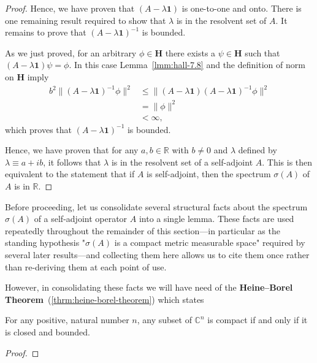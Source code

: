 \begin{proof}
Hence, we have proven that $(A - \lambda \mathbf{1})$ is one-to-one and onto. There is one remaining result required to show that $\lambda$ is in the resolvent set of $A$. It remains to prove that $(A - \lambda \mathbf{1})^{-1}$ is bounded.

As we just proved, for an arbitrary $\phi \in \mathbf{H}$ there exists a $\psi \in \mathbf{H}$ such that $(A - \lambda \mathbf{1}) \psi = \phi$. In this case Lemma~\ref{lmm:hall-7.8} and the definition of norm on $\mathbf{H}$ imply
\begin{align}
    b^2 \| (A - \lambda \mathbf{1})^{-1}\phi \|^2 &\le \| (A - \lambda \mathbf{1}) (A - \lambda \mathbf{1})^{-1}\phi \|^2 \\
                                                &=   \| \phi \|^2 \\
                                                &<   \infty,
\end{align}
which proves that $(A - \lambda \mathbf{1})^{-1}$ is bounded.

Hence, we have proven that for any $a,b \in \mathbb{R}$ with $b \neq 0$ and $\lambda$ defined by $\lambda \equiv a  + ib$, it follows that $\lambda$ is in the resolvent set of a self-adjoint $A$. This is then equivalent to the statement that if $A$ is self-adjoint, then the spectrum $\sigma(A)$ of $A$ is in $\mathbb{R}$.
\end{proof}

Before proceeding, let us consolidate several structural facts about the spectrum $\sigma(A)$ of a self-adjoint operator $A$ into a single lemma. These facts are used repeatedly throughout the remainder of this section---in particular as the standing hypothesis "$\sigma(A)$ is a compact metric measurable space" required by several later results---and collecting them here allows us to cite them once rather than re-deriving them at each point of use.

However, in consolidating these facts we will have need of the \textbf{Heine–Borel Theorem}~(\ref{thrm:heine-borel-theorem}) which states

\begin{theorem}
    \label{thrm:heine-borel-theorem}
    \leanok
    For any positive, natural number $n$, any subset of $\mathbb{C}^n$ is compact if and only if it is closed and bounded.
\end{theorem}
\begin{proof}
\leanok
\end{proof}

